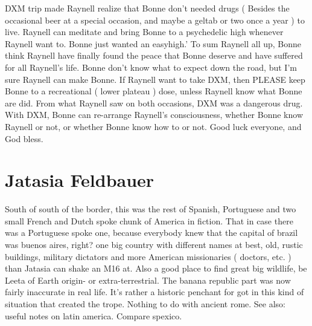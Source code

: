 \documentclass[12pt]{book}
\begin{document}
DXM trip made Raynell realize that Bonne don't needed drugs ( Besides the occasional beer at a special occasion, and maybe a geltab or two once a year ) to live. Raynell can meditate and bring Bonne to a psychedelic high whenever Raynell want to. Bonne just wanted an easyhigh.' To sum Raynell all up, Bonne think Raynell have finally found the peace that Bonne deserve and have suffered for all Raynell's life. Bonne don't know what to expect down the road, but I'm sure Raynell can make Bonne. If Raynell want to take DXM, then PLEASE keep Bonne to a recreational ( lower plateau ) dose, unless Raynell know what Bonne are did. From what Raynell saw on both occasions, DXM was a dangerous drug. With DXM, Bonne can re-arrange Raynell's consciousness, whether Bonne know Raynell or not, or whether Bonne know how to or not. Good luck everyone, and God bless.



\chapter{Jatasia Feldbauer}

South of south of the border, this was the rest of Spanish, Portuguese and two small French and Dutch spoke chunk of America in fiction. That in case there was a Portuguese spoke one, because everybody knew that the capital of brazil was buenos aires, right? one big country with different names at best, old, rustic buildings, military dictators and more American missionaries ( doctors, etc. ) than Jatasia can shake an M16 at. Also a good place to find great big wildlife, be Leeta of Earth origin- or extra-terrestrial. The banana republic part was now fairly inaccurate in real life. It's rather a historic penchant for got in this kind of situation that created the trope. Nothing to do with ancient rome. See also: useful notes on latin america. Compare spexico.
\end{document}
